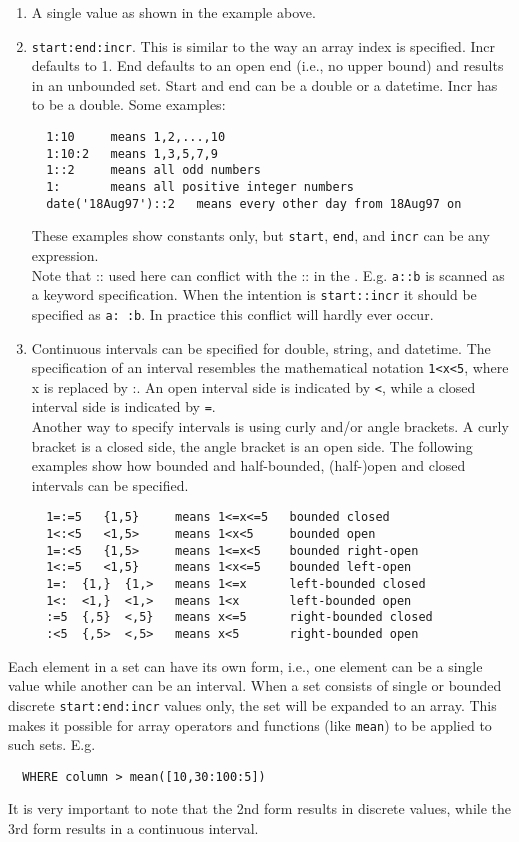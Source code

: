 \begin{enumerate}
\item A single value as shown in the example above.
\item \texttt{start:end:incr}. This is similar to the
way an array index is specified. Incr defaults to 1.
End defaults to an open end (i.e., no upper bound) and results
in an unbounded set. Start and end can be a double or a datetime.
Incr has to be a double. Some examples:
\begin{verbatim}
  1:10     means 1,2,...,10
  1:10:2   means 1,3,5,7,9
  1::2     means all odd numbers
  1:       means all positive integer numbers
  date('18Aug97')::2   means every other day from 18Aug97 on
\end{verbatim}
These examples show constants only, but \texttt{start}, \texttt{end},
and \texttt{incr} can be any expression.
\\Note that :: used here can conflict with the :: in the
. E.g. \texttt{a::b} is scanned as
a keyword specification. When the intention is \texttt{start::incr}
it should be specified as \texttt{a: :b}. In practice this conflict
will hardly ever occur.
\item Continuous intervals can be specified for double, string, and datetime.
The specification of an interval resembles the mathematical notation
\texttt{1<x<5}, where x is replaced by :. An open interval side
is indicated by \texttt{<}, while a closed interval side is indicated
by \texttt{=}.
\\Another way to specify intervals is using curly and/or angle brackets.
A curly bracket is a closed side, the angle bracket is an open side.
The following examples show how bounded and half-bounded,
(half-)open and closed intervals can be specified.
\begin{verbatim}
  1=:=5   {1,5}     means 1<=x<=5   bounded closed
  1<:<5   <1,5>     means 1<x<5     bounded open
  1=:<5   {1,5>     means 1<=x<5    bounded right-open
  1<:=5   <1,5}     means 1<x<=5    bounded left-open
  1=:  {1,}  {1,>   means 1<=x      left-bounded closed
  1<:  <1,}  <1,>   means 1<x       left-bounded open
  :=5  {,5}  <,5}   means x<=5      right-bounded closed
  :<5  {,5>  <,5>   means x<5       right-bounded open
\end{verbatim}
\end{enumerate}
Each element in a set can have its own form, i.e., one element can
be a single value while another can be an interval.
When a set consists of single or bounded discrete
\texttt{start:end:incr} values only, the set will be expanded to an
array.
This makes it possible for array operators and functions
(like \texttt{mean}) to be applied to such sets. E.g.
\begin{verbatim}
  WHERE column > mean([10,30:100:5])
\end{verbatim}
It is very important to note that the 2nd form results in
discrete values, while the 3rd form results in a continuous interval.

